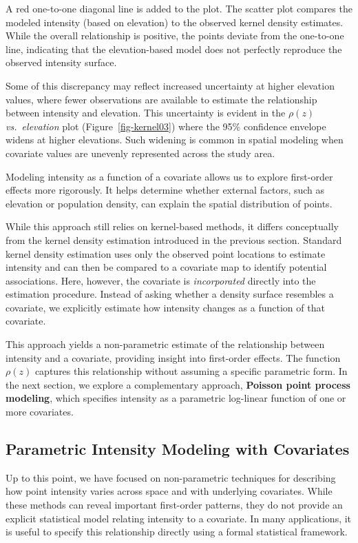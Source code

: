 \documentclass[
  letterpaper,
]{book}
\begin{document}
A red one-to-one diagonal line is added to the plot. The scatter plot
compares the modeled intensity (based on elevation) to the observed
kernel density estimates. While the overall relationship is positive,
the points deviate from the one-to-one line, indicating that the
elevation-based model does not perfectly reproduce the observed
intensity surface.

Some of this discrepancy may reflect increased uncertainty at higher
elevation values, where fewer observations are available to estimate the
relationship between intensity and elevation. This uncertainty is
evident in the \(\rho(z)\) \emph{vs.~elevation} plot
(Figure~\ref{fig-kernel03}) where the 95\% confidence envelope widens at
higher elevations. Such widening is common in spatial modeling when
covariate values are unevenly represented across the study area.

Modeling intensity as a function of a covariate allows us to explore
first-order effects more rigorously. It helps determine whether external
factors, such as elevation or population density, can explain the
spatial distribution of points.

While this approach still relies on kernel-based methods, it differs
conceptually from the kernel density estimation introduced in the
previous section. Standard kernel density estimation uses only the
observed point locations to estimate intensity and can then be compared
to a covariate map to identify potential associations. Here, however,
the covariate is \emph{incorporated} directly into the estimation
procedure. Instead of asking whether a density surface resembles a
covariate, we explicitly estimate how intensity changes as a function of
that covariate.

This approach yields a non-parametric estimate of the relationship
between intensity and a covariate, providing insight into first-order
effects. The function \(\rho(z)\) captures this relationship without
assuming a specific parametric form. In the next section, we explore a
complementary approach, \textbf{Poisson point process modeling}, which
specifies intensity as a parametric log-linear function of one or more
covariates.

\subsection{Parametric Intensity Modeling with
Covariates}\label{parametric-intensity-modeling-with-covariates}

Up to this point, we have focused on non-parametric techniques for
describing how point intensity varies across space and with underlying
covariates. While these methods can reveal important first-order
patterns, they do not provide an explicit statistical model relating
intensity to a covariate. In many applications, it is useful to specify
this relationship directly using a formal statistical framework.
\end{document}
